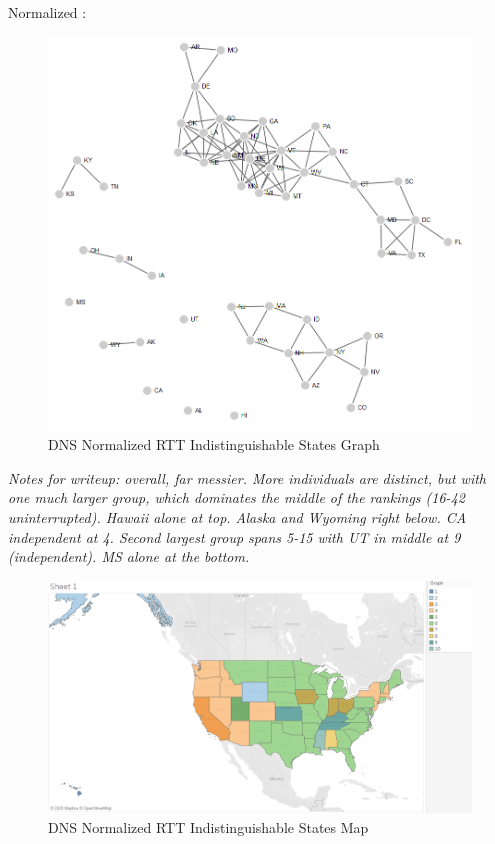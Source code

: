 Normalized \rtt:
\begin{figure}[H]
    \centering
    \includegraphics[width=\textwidth]{images/dns/kruskals_analysis_no_auth_agg/rtt_normalized/graph.png}
    \caption{DNS Normalized RTT Indistinguishable States Graph}
    \label{fig:dns_normalized_rtt_indistinguishable_states_graph}
\end{figure}

\textit{Notes for writeup: overall, far messier. More individuals are distinct, but with one much larger group, which dominates the middle of the rankings (16-42 uninterrupted). Hawaii alone at top. Alaska and Wyoming right below. CA independent at 4. Second largest group spans 5-15 with UT in middle at 9 (independent). MS alone at the bottom.}

\begin{figure}[H]
    \centering
    \includegraphics[width=\textwidth]{images/dns/kruskals_analysis_no_auth_agg/rtt_normalized/distinct_map1.png}
    \caption{DNS Normalized RTT Indistinguishable States Map}
    \label{fig:dns_normalized_rtt_indistinguishable_states_map}
\end{figure}

